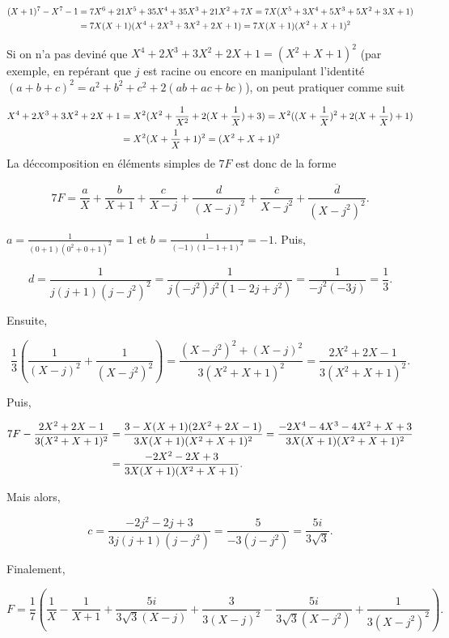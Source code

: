 {{\begin{align*}\ensuremath
(X+1)^7-X^7-1&=7X^6+21X^5+35X^4+35X^3+21X^2+7X=7X(X^5+3X^4+5X^3+5X^2+3X+1)\\
 &=7X(X+1)(X^4+2X^3+3X^2+2X+1)=7X(X+1)(X^2+X+1)^2
\end{align*}

Si on n'a pas deviné que $X^4+2X^3+3X^2+2X+1=(X^2+X+1)^2$ (par exemple, en repérant que $j$ est racine ou encore en manipulant l'identité $(a+b+c)^2=a^2+b^2+c^2+2(ab+ac+bc)$), on peut pratiquer comme suit

\begin{align*}\ensuremath
X^4+2X^3+3X^2+2X+1&=X^2(X^2+\frac{1}{X^2}+2(X+\frac{1}{X})+3)=X^2((X+\frac{1}{X})^2+2(X+\frac{1}{X})+1)\\
 &=X^2(X+\frac{1}{X}+1)^2=(X^2+X+1)^2
\end{align*}
La déccomposition en éléments simples de $7F$ est donc de la forme

$$7F=\frac{a}{X}+\frac{b}{X+1}+\frac{c}{X-j}+\frac{d}{(X-j)^2}+\frac{\overline{c}}{X-j^2}+\frac{\overline{d}}{(X-j^2)^2}.$$

$a=\frac{1}{(0+1)(0^2+0+1)^2}=1$ et $b=\frac{1}{(-1)(1-1+1)^2}=-1$. Puis,

$$d=\frac{1}{j(j+1)(j-j^2)^2}=\frac{1}{j(-j^2)j^2(1-2j+j^2)}=\frac{1}{-j^2(-3j)}=\frac{1}{3}.$$

Ensuite, 

$$\frac{1}{3}(\frac{1}{(X-j)^2}+\frac{1}{(X-j^2)^2})=\frac{(X-j^2)^2+(X-j)^2}{3(X^2+X+1)^2}
=\frac{2X^2+2X-1}{3(X^2+X+1)^2}.$$

Puis,

\begin{align*}\ensuremath
7F-\frac{2X^2+2X-1}{3(X^2+X+1)^2}&=\frac{3-X(X+1)(2X^2+2X-1)}{3X(X+1)(X^2+X+1)^2}
=\frac{-2X^4-4X^3-4X^2+X+3}{3X(X+1)(X^2+X+1)^2}\\
 &=\frac{-2X^2-2X+3}{3X(X+1)(X^2+X+1)}.
\end{align*}

Mais alors, 

$$c=\frac{-2j^2-2j+3}{3j(j+1)(j-j^2)}=\frac{5}{-3(j-j^2)}=\frac{5i}{3\sqrt{3}}.$$

Finalement,

$$F=\frac{1}{7}(\frac{1}{X}-\frac{1}{X+1}+\frac{5i}{3\sqrt{3}(X-j)}+\frac{3}{3(X-j)^2}-\frac{5i}{3\sqrt{3}(X-j^2)}+\frac{1}{3(X-j^2)^2}).$$
}
}
